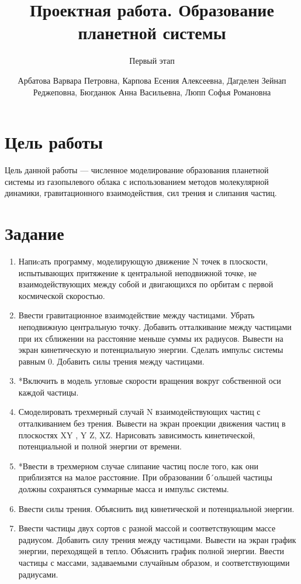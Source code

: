 \documentclass[
  english,
  russian,
  12pt,
  a4paper,
  DIV=11,
  numbers=noendperiod]{scrreprt}
\title{Проектная работа. Образование планетной системы}
\subtitle{Первый этап}
\author{Арбатова Варвара Петровна, Карпова Есения Алексеевна, Дагделен
Зейнап Реджеповна, Бюгданюк Анна Васильевна, Люпп Софья Романовна}
\date{}
\renewcommand*\contentsname{Содержание}
\newcommand\contentsname{Содержание}
\begin{document}
\maketitle

\renewcommand*\contentsname{Содержание}
{
\setcounter{tocdepth}{1}
\tableofcontents
}
\listoffigures
\listoftables

\chapter{Цель
работы}\label{ux446ux435ux43bux44c-ux440ux430ux431ux43eux442ux44b}

Цель данной работы --- численное моделирование образования планетной
системы из газопылевого облака с использованием методов молекулярной
динамики, гравитационного взаимодействия, сил трения и слипания частиц.

\chapter{Задание}\label{ux437ux430ux434ux430ux43dux438ux435}

\begin{enumerate}
\def\labelenumi{\arabic{enumi}.}
\item
  Напиcать программу, моделирующую движение N точек в плоскости,
  испытывающих притяжение к центральной неподвижной точке, не
  взаимодействующих между собой и двигающихся по орбитам с первой
  космической скоростью.
\item
  Ввести гравитационное взаимодействие между частицами. Убрать
  неподвижную центральную точку. Добавить отталкивание между частицами
  при их сближении на расстояние меньше суммы их радиусов. Вывести на
  экран кинетическую и потенциальную энергии. Сделать импульс системы
  равным 0. Добавить силы трения между частицами.
\item
  *Включить в модель угловые скорости вращения вокруг собственной оси
  каждой частицы.
\item
  Смоделировать трехмерный случай N взаимодействующих частиц с
  отталкиванием без трения. Вывести на экран проекции движения частиц в
  плоскостях XY , Y Z, XZ. Нарисовать зависимость кинетической,
  потенциальной и полной энергии от времени.
\item
  *Ввести в трехмерном случае слипание частиц после того, как они
  приблизятся на малое расстояние. При образовании б´ольшей частицы
  должны сохраняться суммарные масса и импульс системы.
\item
  Ввести силы трения. Объяснить вид кинетической и потенциальной
  энергии.
\item
  Ввести частицы двух сортов с разной массой и соответствующим массе
  радиусом. Добавить силу трения между частицами. Вывести на экран
  график энергии, переходящей в тепло. Объяснить график полной энергии.
  Ввести частицы с массами, задаваемыми случайным образом, и
  соответствующими радиусами.
\end{enumerate}
\end{document}

